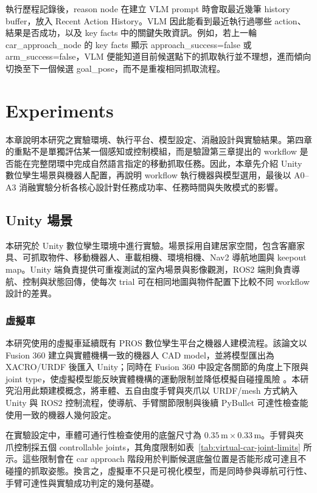 \documentclass[12pt,a4paper]{article}
\begin{document}
執行歷程記錄後，reason node 在建立 VLM prompt 時會取最近幾筆 history buffer，放入 Recent Action History。VLM 因此能看到最近執行過哪些 action、結果是否成功，以及 key facts 中的關鍵失敗資訊。例如，若上一輪 car\_approach\_node 的 key facts 顯示 approach\_success=false 或 arm\_success=false，VLM 便能知道目前候選點下的抓取執行並不理想，進而傾向切換至下一個候選 goal\_pose，而不是重複相同抓取流程。



\section{Experiments}

本章說明本研究之實驗環境、執行平台、模型設定、消融設計與實驗結果。第四章的重點不是單獨評估某一個感知或控制模組，而是驗證第三章提出的 workflow 是否能在完整閉環中完成自然語言指定的移動抓取任務。因此，本章先介紹 Unity 數位孿生場景與機器人配置，再說明 workflow 執行機器與模型選用，最後以 A0--A3 消融實驗分析各核心設計對任務成功率、任務時間與失敗模式的影響。

\subsection{Unity 場景}

本研究於 Unity 數位孿生環境中進行實驗。場景採用自建居家空間，包含客廳家具、可抓取物件、移動機器人、車載相機、環境相機、Nav2 導航地圖與 keepout map。Unity 端負責提供可重複測試的室內場景與影像觀測，ROS2 端則負責導航、控制與狀態回傳，使每次 trial 可在相同地圖與物件配置下比較不同 workflow 設計的差異。

\subsubsection{虛擬車}

本研究使用的虛擬車延續既有 PROS 數位孿生平台之機器人建模流程。該論文以 Fusion 360 建立與實體機構一致的機器人 CAD model，並將模型匯出為 XACRO/URDF 後匯入 Unity；同時在 Fusion 360 中設定各關節的角度上下限與 joint type，使虛擬模型能反映實體機構的運動限制並降低模擬自碰撞風險 \cite{yushiang2025}。本研究沿用此類建模概念，將車體、五自由度手臂與夾爪以 URDF/mesh 方式納入 Unity 與 ROS2 控制流程，使導航、手臂關節限制與後續 PyBullet 可達性檢查能使用一致的機器人幾何設定。

在實驗設定中，車體可通行性檢查使用的底盤尺寸為 $0.35\,\mathrm{m}\times0.33\,\mathrm{m}$。手臂與夾爪控制採五個 controllable joints，其角度限制如表~\ref{tab:virtual-car-joint-limits} 所示。這些限制會在 car approach 階段用於判斷候選底盤位置是否能形成可達且不碰撞的抓取姿態。換言之，虛擬車不只是可視化模型，而是同時參與導航可行性、手臂可達性與實驗成功判定的幾何基礎。
\end{document}
